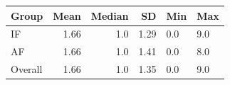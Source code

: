 \begin{tabular}{lrrr}
  \toprule
  Group & Mean & Median & SD & Min & Max \\ 
  \midrule
  IF & 1.66 & 1.0 & 1.29 & 0.0 & 9.0 \\ 
  AF & 1.66 & 1.0 & 1.41 & 0.0 & 8.0 \\ 
  Overall & 1.66 & 1.0 & 1.35 & 0.0 & 9.0 \\ 
  \bottomrule
\end{tabular}
